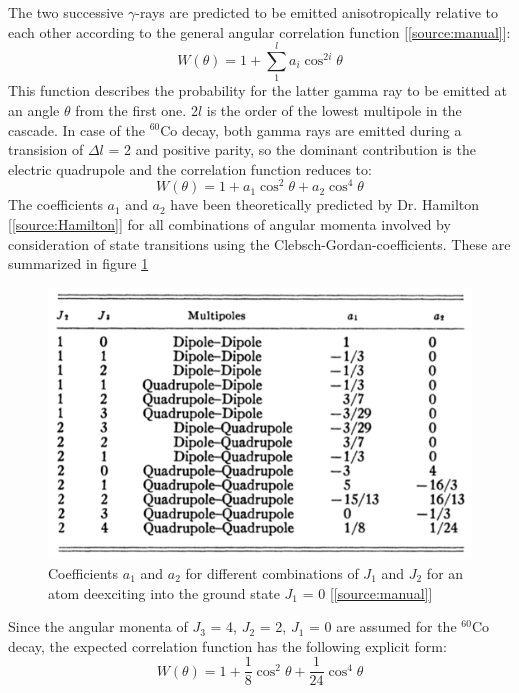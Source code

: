 \documentclass[a4paper,parskip,11pt, DIV12]{scrreprt}
\begin{document}
		The two successive $\gamma$-rays are predicted to be emitted anisotropically relative to each other according to the general angular correlation function [\ref{source:manual}]:
		\begin{equation}
		W(\theta) = 1 + \sum^l_1 a_i \cos ^{2i} \theta
		\end{equation}	
		This function describes the probability for the latter gamma ray to be emitted at an angle $\theta$ from the first one. 2$l$ is the order of the lowest multipole in the cascade. In case of the $^{60}$Co decay, both gamma rays are emitted during a transision of $\Delta l$ = 2 and positive parity, so the dominant contribution is the electric quadrupole and the correlation function reduces to:	
		\begin{equation}
		W(\theta) = 1 + a_1 \cos ^{2} \theta +  a_2 \cos ^{4} \theta
		\end{equation}		
		The coefficients $a_1$ and $a_2$ have been theoretically predicted by Dr. Hamilton [\ref{source:Hamilton}] for all combinations of angular momenta involved by consideration of state transitions using the Clebsch-Gordan-coefficients. These are summarized in figure \ref{fig:coefficients}		
		\begin{figure}[H]
\centering
\includegraphics[scale=0.4]{Coefficients.png}
\caption[Coefficients]{Coefficients $a_1$ and $a_2$ for different combinations of $J_1$ and $J_2$ for an atom deexciting into the ground state $J_1$ = 0 [\ref{source:manual}]}
\label{fig:coefficients}
		\end{figure}		
		Since the angular monenta of $J_3$ = 4, $J_2$ = 2, $J_1$ = 0 are assumed for the $^{60}$Co decay, the expected correlation function has the following explicit form:		
		\begin{equation} \label{eq:AngularCorrelation}
		W(\theta) = 1 + \frac{1}{8} \cos ^{2} \theta +  \frac{1}{24} \cos ^{4} \theta
		\end{equation} 
		
\end{document}
